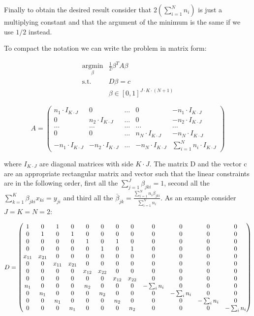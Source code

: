 \documentclass{article}
\begin{document}
Finally to obtain the desired result consider that $2\left(\sum_{i=1}^{N} n_i\right)$ is just a multiplying constant and that the argument of the minimum is the same if we use $1/2$ instead.

To compact the notation we can write the problem in matrix form:

\begin{align*}
\underset{\beta}{\text{arg}\min}& \frac{1}{2}\beta^T A \beta\\
\text{s.t. }&D\beta=c\\
 		    & \beta \in [0,1]^{J\cdot K\cdot (N+1)}
\end{align*}

\begin{equation*}
A=\begin{pmatrix}
n_1\cdot I_{K \cdot J}&0  &\ldots  &0  &-n_1\cdot I_{K \cdot J} \\ 
0 &n_2\cdot I_{K \cdot J}  &\ldots  &0  &-n_2\cdot I_{K \cdot J} \\ 
 \ldots&\ldots  &\ldots  &\ldots  &\ldots \\ 
 0 &0  &\ldots  &n_N\cdot I_{K \cdot J}  &-n_N\cdot I_{K \cdot J} \\ 
 -n_1\cdot I_{K \cdot J} &-n_2\cdot I_{K \cdot J}   &\ldots  &-n_N\cdot I_{K \cdot J}   &\sum_{i=1}^{N}n_i\cdot I_{K \cdot J} 
\end{pmatrix}
\end{equation*}

where $I_{K \cdot J}$ are diagonal matrices with side $K \cdot J$. The matrix D and the vector c are an appropriate rectangular matrix and vector such that the linear constraints are in the following order, first all the $\sum_{j=1}^{J}\beta_{jki}=1$, second all the $\sum_{k=1}^{K}\beta_{jki}x_{ki}=y_{ji}$ and third all the $\bar{\beta}_{jk}=\frac{\sum_{i=1}^{N} n_i \beta_{jki}}{\sum_{i=1}^{N} n_i}$. As an example consider $J=K=N=2$:

\begin{equation*}
\setcounter{MaxMatrixCols}{20}
D=\begin{pmatrix}
1 & 0 & 1 & 0 & 0 & 0 & 0 & 0 & 0 & 0 & 0 & 0\\
0 & 1 & 0 & 1 & 0 & 0 & 0 & 0 & 0 & 0 & 0 & 0\\
0 & 0 & 0 & 0 & 1 & 0 & 1 & 0 & 0 & 0 & 0 & 0\\
0 & 0 & 0 & 0 & 0 & 1 & 0 & 1 & 0 & 0 & 0 & 0\\
x_{11} & x_{21} & 0 & 0 & 0 & 0 & 0 & 0 & 0 & 0 & 0 & 0\\
0 & 0 & x_{11} & x_{21} & 0 & 0 & 0 & 0 & 0 & 0 & 0 & 0\\
0 & 0 & 0 & 0 & x_{12} & x_{22} & 0 & 0 & 0 & 0 & 0 & 0\\
0 & 0 & 0 & 0 & 0 & 0 & x_{12} & x_{22} & 0 & 0 & 0 & 0\\
n_1 & 0 & 0 & 0 & n_2 & 0 & 0 & 0 & -\sum_i n_i & 0 & 0 & 0\\
0 & n_1 & 0 & 0 & 0 & n_2 & 0 & 0 & 0 & -\sum_i n_i & 0 & 0\\
0 & 0 & n_1 & 0 & 0 & 0 & n_2 & 0 & 0 & 0 & -\sum_i n_i & 0\\
0 & 0 & 0 & n_1 & 0 & 0 & 0 & n_2 & 0 & 0 & 0 & -\sum_i n_i
\end{pmatrix}
\end{equation*}
\end{document}

